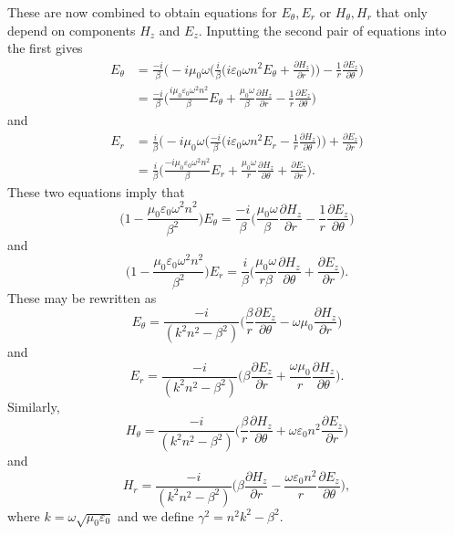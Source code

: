 \documentclass[12pt]{article}
\theoremstyle{definition}
\numberwithin{equation}{section}
\begin{document}
{These are now combined to obtain equations for $E_\theta,E_r$ or $H_\theta,H_r$ that only depend on components $H_z$ and $E_z$. Inputting the second pair of equations into the first gives 
\begin{align}
E_{\theta} &= \frac{-i}{\beta}\bigg(-i\mu_{0}\omega \bigg(\frac{i}{\beta}\bigg(i\varepsilon_{0}\omega n^2 E_{\theta} + \frac{\partial H_z}{\partial r}\bigg) \bigg)-\frac{1}{r}\frac{\partial E_z}{\partial\theta}\bigg)\nonumber\\
&=\frac{-i}{\beta}\bigg(\frac{i\mu_{0}\varepsilon_{0}\omega^2 n^2}{\beta} E_{\theta} + \frac{\mu_{0}\omega}{\beta}\frac{\partial H_z}{\partial r}-\frac{1}{r}\frac{\partial E_z}{\partial\theta}\bigg)\nonumber
\end{align}
and
\begin{align}
E_{r} &=\frac{i}{\beta}\bigg(-i\mu_{0}\omega \bigg(\frac{-i}{\beta}\bigg(i\varepsilon_{0}\omega n^2 E_r - \frac{1}{r}\frac{\partial H_z}{\partial\theta}\bigg)\bigg) +\frac{\partial E_z}{\partial r}\bigg)\nonumber\\
&=\frac{i}{\beta}\bigg(\frac{-i\mu_0\varepsilon_0\omega^2 n^2}{\beta}E_r+\frac{\mu_0\omega}{r}\frac{\partial H_z}{\partial\theta}+\frac{\partial E_z}{\partial r}\bigg).\nonumber
\end{align}
These two equations imply that
$$\bigg(1-\frac{\mu_{0}\varepsilon_{0}\omega^{2} n^2}{\beta^2}\bigg) E_{\theta}=\frac{-i}{\beta}\bigg(\frac{\mu_0\omega}{\beta}\frac{\partial H_z}{\partial r}-\frac{1}{r}\frac{\partial E_z}{\partial\theta}\bigg)$$
and
$$\bigg(1-\frac{\mu_0\varepsilon_0\omega^2 n^2}{\beta^2}\bigg)E_r=\frac{i}{\beta}\bigg(\frac{\mu_0\omega}{r\beta}\frac{\partial H_z}{\partial\theta}+\frac{\partial E_z}{\partial r}\bigg).$$
These may be rewritten as
\begin{equation}
E_\theta=\frac{-i}{(k^2 n^2 -\beta^2 )}\bigg(\frac{\beta}{r}\frac{\partial E_z}{\partial\theta}-\omega\mu_0\frac{\partial H_z}{\partial r}\bigg)
\label{TE5.eqn}
\end{equation}
and
\begin{equation}
E_r=\frac{-i}{(k^2 n^2 -\beta^2 )}\bigg(\beta\frac{\partial E_z}{\partial r}+\frac{\omega\mu_0}{r}\frac{\partial H_z}{\partial\theta}\bigg).
\label{TE6.eqn}
\end{equation}
Similarly,
\begin{equation}
H_\theta = \frac{-i}{(k^2 n^2 -\beta^2 )}\bigg(\frac{\beta}{r}\frac{\partial H_z}{\partial\theta}+\omega\varepsilon_0 n^2\frac{\partial E_z}{\partial r}\bigg)
\label{TE7.eqn}
\end{equation}
and
\begin{equation}
H_r = \frac{-i}{(k^2 n^2 -\beta^2 )}\bigg(\beta\frac{\partial H_z}{\partial r} -\frac{\omega\varepsilon_0 n^2}{r}\frac{\partial E_z}{\partial\theta}\bigg),
\label{TE8.eqn}
\end{equation}
where $k=\omega\sqrt{\mu_0\varepsilon_0}$ and we define $\gamma^2=n^2k^2-\beta^2$.

}
\end{document}
